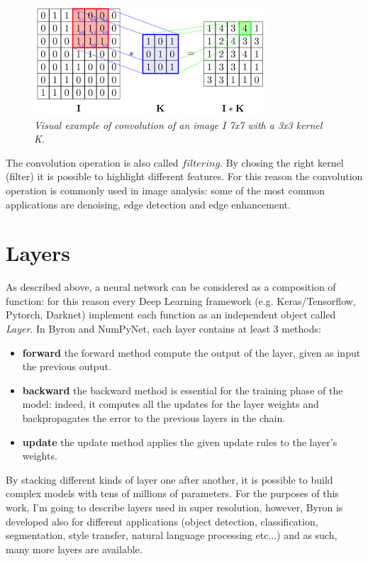 \documentclass[12pt,a4paper]{report}
\begin{document}
\begin{figure}[h]
 \centering
 \includegraphics[scale=1.]{./images/conv.png}
 \caption{\it Visual example of convolution of an image I 7x7 with a 3x3 kernel K.}
 \label{fig:convolution}
\end{figure}

The convolution operation is also called $filtering$. By chosing the right kernel (filter) it is possible to highlight different features. For this reason the convolution operation is commonly used in image analysis: some of the most common applications are denoising, edge detection and edge enhancement. 

\section{Layers}

As described above, a neural network can be considered as a composition of function: for this reason every Deep Learning framework (e.g. Keras/Tensorflow, Pytorch, Darknet) implement each function as an independent object called {\it Layer}. In Byron and NumPyNet, each layer contains at least 3 methods:
\begin{itemize}
 \setlength\itemsep{-0.3em}
 \item {\bf forward} the forward method compute the output of the layer, given as input the previous output. 
 \item {\bf backward} the backward method is essential for the training phase of the model: indeed, it computes all the updates for the layer weights and backpropagates the error to the previous layers in the chain.
 \item {\bf update} the update method applies the given update rules to the layer's weights.
\end{itemize}
By stacking different kinds of layer one after another, it is possible to build 
complex models with tens of millions of parameters. 
For the purposes of this work, I'm going to describe layers used in super resolution, however, Byron is developed also for different applications (object detection, classification, segmentation, style transfer, natural language processing etc...) and as such, many more layers are available.   
\end{document}
